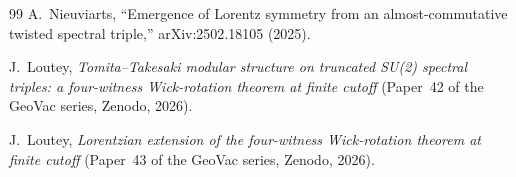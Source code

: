 \documentclass[11pt]{article}
\begin{document}
\begin{thebibliography}{99}
A.~Nieuviarts,
``Emergence of Lorentz symmetry from an almost-commutative twisted
spectral triple,''
arXiv:2502.18105 (2025).

J.~Loutey, \emph{Tomita--Takesaki modular structure on truncated SU(2)
spectral triples: a four-witness Wick-rotation theorem at finite
cutoff} (Paper~42 of the GeoVac series, Zenodo, 2026).

J.~Loutey, \emph{Lorentzian extension of the four-witness
Wick-rotation theorem at finite cutoff} (Paper~43 of the GeoVac
series, Zenodo, 2026).

\end{thebibliography}
\end{document}
